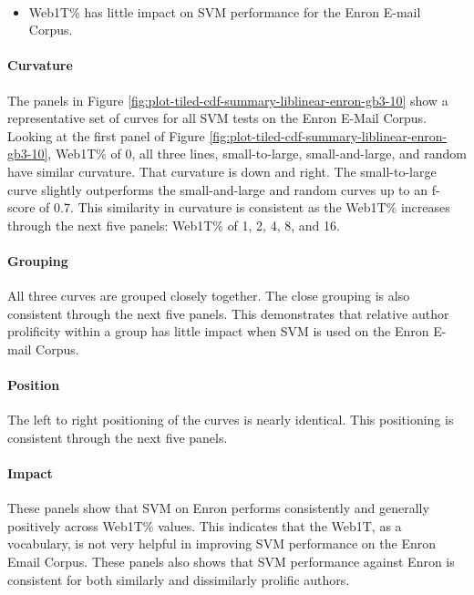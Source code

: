 	\paragraph*{}  
	\begin{itemize}
	\item Web1T\% has little impact on SVM performance for the Enron E-mail Corpus.
	\end{itemize}
	\paragraph*{Curvature}The panels in Figure \ref{fig:plot-tiled-cdf-summary-liblinear-enron-gb3-10} show a representative set of curves for all SVM tests on the Enron E-Mail Corpus.  Looking at the first panel of Figure \ref{fig:plot-tiled-cdf-summary-liblinear-enron-gb3-10}, Web1T\% of 0, all three lines, small-to-large, small-and-large, and random have similar curvature.  That curvature is down and right. The small-to-large curve slightly outperforms the small-and-large and random curves up to an f-score of 0.7. This similarity in curvature is consistent as the Web1T\% increases through the next five panels: Web1T\% of 1, 2, 4, 8, and 16. 
	\paragraph*{Grouping}All three curves are grouped closely together.  The close grouping is also consistent through the next five panels. This demonstrates that relative author prolificity within a group has little impact when SVM is used on the Enron E-mail Corpus.
	\paragraph*{Position}The left to right positioning of the curves is nearly identical.  This positioning is consistent through the next five panels.
	\paragraph*{Impact} These panels show that SVM on Enron performs consistently and generally positively across Web1T\% values.  This indicates that the Web1T, as a vocabulary, is not very helpful in improving SVM performance on the Enron Email Corpus. These panels also shows that SVM performance against Enron is consistent for both similarly and dissimilarly prolific authors.
	
